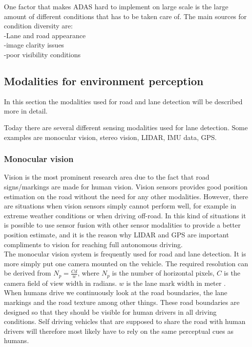 One factor that makes ADAS hard to implement on large scale is the large amount of different conditions that has to be taken care of. The main sources for condition diversity are:\\
-Lane and road appearance\\
-image clarity issues\\
-poor visibility conditions\\

\subsection{Modalities for environment perception}
In this section the modalities used for road and lane detection will be described more in detail. 

Today there are several different sensing modalities used for lane detection. Some examples are monocular vision, stereo vision, LIDAR, IMU data, GPS.\\

\subsubsection{Monocular vision}
Vision is the most prominent research area due to the fact that road signs/markings are made for human vision. Vision sensors provides good position estimation on the road without the need for any other modalities. However, there are situations when vision sensors simply cannot perform well, for example in extreme weather conditions or when driving off-road. In this kind of situations it is possible to use sensor fusion with other sensor modalities to provide a better position estimate, and it is the reason why LIDAR and GPS are important compliments to vision for reaching full autonomous driving.\\



The monocular vision system is frequently used for road and lane detection. It is more simply put one camera mounted on the vehicle. The required resolution can be derived from $N_p = \frac{Cd}{w}$, where $N_p$ is the number of horizontal pixels, $C$ is the camera field of view width in radians. $w$ is the lane mark width in meter \cite{BarHillel2014}.\\
When humans drive we continuously look at the road boundaries, the lane markings and the road texture among other things. These road boundaries are designed so that they should be visible for human drivers in all driving conditions. Self driving vehicles that are supposed to share the road with human drivers will therefore most likely have to rely on the same perceptual cues as humans.

